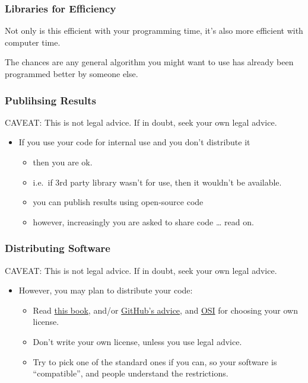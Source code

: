 \subsubsection{Libraries for Efficiency}\label{libraries-for-efficiency}

Not only is this efficient with your programming time, it's also more
efficient with computer time.

The chances are any general algorithm you might want to use has already
been programmed better by someone else.

\subsubsection{Publihsing Results}\label{publihsing-results}

CAVEAT: This is not legal advice. If in doubt, seek your own legal
advice.

\begin{itemize}
\itemsep1pt\parskip0pt
\item
  If you use your code for internal use and you don't distribute it

  \begin{itemize}
  \itemsep1pt\parskip0pt
  \item
    then you are ok.
  \item
    i.e.~if 3rd party library wasn't for use, then it wouldn't be
    available.
  \item
    you can publish results using open-source code
  \item
    however, increasingly you are asked to share code \ldots{} read on.
  \end{itemize}
\end{itemize}

\subsubsection{Distributing Software}\label{distributing-software}

CAVEAT: This is not legal advice. If in doubt, seek your own legal
advice.

\begin{itemize}
\itemsep1pt\parskip0pt
\item
  However, you may plan to distribute your code:

  \begin{itemize}
  \itemsep1pt\parskip0pt
  \item
    Read \href{http://www.oreilly.com/openbook/osfreesoft/book/}{this
    book}, and/or \href{http://choosealicense.com/}{GitHub's advice},
    and \href{http://opensource.org/}{OSI} for choosing your own
    license.
  \item
    Don't write your own license, unless you use legal advice.
  \item
    Try to pick one of the standard ones if you can, so your software is
    ``compatible'', and people understand the restrictions.
  \end{itemize}
\end{itemize}

